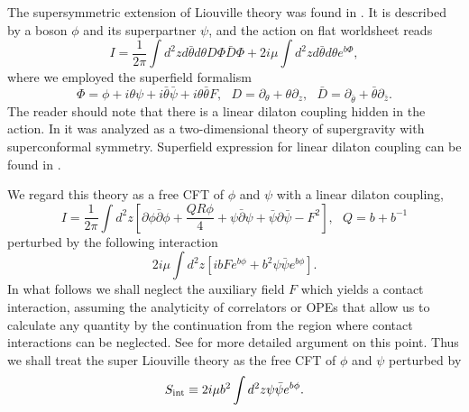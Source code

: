 \documentclass[a4paper,12pt]{article}
\newcommand{\tfrac}[2]{{\textstyle\frac{#1}{#2}}}
\begin{document}
   The supersymmetric extension of Liouville theory was found
 in \cite{Polyakov2}.
 It is described by a boson $\phi$ and its superpartner $\psi$,
 and the action on flat worldsheet reads
\begin{equation}
  I = \frac{1}{2\pi}\int d^2zd\bar{\theta}d\theta D\Phi\bar{D}\Phi
     +2i\mu\int d^2zd\bar{\theta}d\theta e^{b\Phi},
\end{equation}
 where we employed the superfield formalism
\begin{equation}
  \Phi= \phi+i\theta\psi+i\bar{\theta}\bar{\psi}+i\theta\bar{\theta}F,~~~
  D=\partial_\theta+\theta\partial_z,~~~
  \bar{D}=\partial_{\bar{\theta}}+\bar{\theta}\partial_{\bar{z}}.
\end{equation}
 The reader should note that there is a linear dilaton coupling
 hidden in the action.
 In \cite{DHK} it was analyzed as a two-dimensional theory of
 supergravity with superconformal symmetry.
 Superfield expression for linear dilaton coupling
 can be found in \cite{CKT}.

   We regard this theory as a free CFT of $\phi$ and $\psi$ with
 a linear dilaton coupling,
\begin{equation}
  I = \frac{1}{2\pi}\int d^2z\left[
       \partial\phi\bar{\partial}\phi+\tfrac{QR\phi}{4}
      +\psi\bar{\partial}\psi+\bar{\psi}\partial\bar{\psi}-F^2
      \right],~~~
      Q=b+b^{-1}
\end{equation}
 perturbed by the following interaction
\begin{equation}
   2i\mu\int d^2z
   \left[ibFe^{b\phi}+b^2\psi\bar{\psi}e^{b\phi}\right].
\end{equation}
 In what follows we shall neglect the auxiliary field $F$ which
 yields a contact interaction, assuming the analyticity of correlators
 or OPEs that allow us to calculate any quantity by the continuation
 from the region where contact interactions can be neglected.
 See \cite{GS, DS, dFK} for more detailed argument on this point.
 Thus we shall treat the super Liouville theory as the free CFT
 of $\phi$ and $\psi$ perturbed by
\begin{equation}
  S_{\rm int} \equiv 2i\mu b^2\int d^2z \psi\bar{\psi}e^{b\phi}.
\end{equation}
\end{document}

